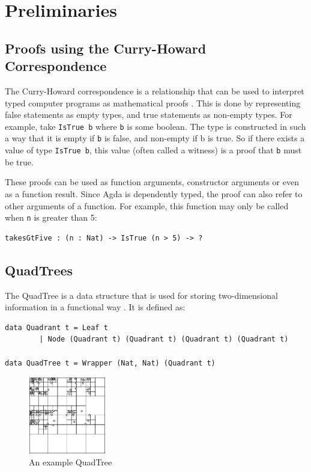 \section{Preliminaries}
\subsection{Proofs using the Curry-Howard Correspondence}
The Curry-Howard correspondence is a relationship that can be used to interpret typed computer programs as mathematical proofs \cite{chc}. This is done by representing false statements as empty types, and true statements as non-empty types. For example, take  \verb|IsTrue b|  where  \verb|b| is some boolean. The type is constructed in such a way that it is empty if  \verb|b| is false, and non-empty if b is true.  So if there exists a value of type  \verb|IsTrue b|, this value (often called a witness) is a proof that  \verb|b| must be true. 

These proofs can be used as function arguments, constructor arguments or even as a function result. Since Agda is dependently typed, the proof can also refer to other arguments of a function. For example, this function may only be called when \verb|n| is greater than 5:
\begin{verbatim}
takesGtFive : (n : Nat) -> IsTrue (n > 5) -> ?
\end{verbatim}

\subsection{QuadTrees}
The QuadTree is a data structure that is used for storing two-dimensional information in a functional way \cite{Finkel1974}. It is defined as:
\begin{verbatim}
data Quadrant t = Leaf t
        | Node (Quadrant t) (Quadrant t) (Quadrant t) (Quadrant t)

data QuadTree t = Wrapper (Nat, Nat) (Quadrant t)
\end{verbatim}

\begin{figure} %
    \includegraphics[width=0.3\textwidth]{graphics/test.png}
    \caption{An example QuadTree}
    \label{quadtree}
\end{figure}


